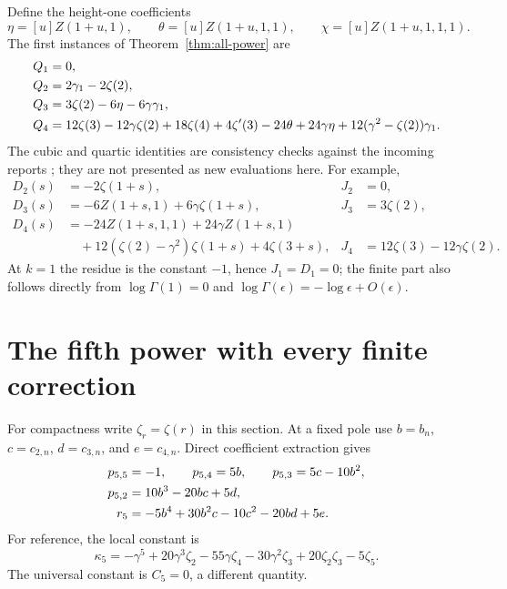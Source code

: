 \documentclass[11pt,a4paper]{article}
\numberwithin{equation}{section}
\theoremstyle{definition}
\theoremstyle{remark}
\begin{document}
Define the height-one coefficients
\begin{equation}
 \eta=[u]Z(1+u,1),\qquad
 \theta=[u]Z(1+u,1,1),\qquad
 \chi=[u]Z(1+u,1,1,1).
 \label{eq:height-coefficients}
\end{equation}
The first instances of Theorem~\ref{thm:all-power} are
\begin{align}
 Q_1={}&0,\notag\\
 Q_2={}&2\gamma_1-2\zeta(2),\label{eq:Q2}\\
 Q_3={}&3\zeta(2)-6\eta-6\gamma\gamma_1,\label{eq:Q3}\\
 Q_4={}&12\zeta(3)-12\gamma\zeta(2)+18\zeta(4)+4\zeta'(3)
       -24\theta+24\gamma\eta
                  +12(\gamma^2-\zeta(2))\gamma_1.
 \label{eq:Q4}
\end{align}
The cubic and quartic identities are consistency checks against the
incoming reports \cite{Quartic,Barnes}; they are not presented as new
evaluations here.  For example,
\begin{align*}
 D_2(s)&=-2\zeta(1+s),& J_2&=0,\\
 D_3(s)&=-6Z(1+s,1)+6\gamma\zeta(1+s),&J_3&=3\zeta(2),\\
 D_4(s)&=-24Z(1+s,1,1)+24\gamma Z(1+s,1)\\
       &\quad+12(\zeta(2)-\gamma^2)\zeta(1+s)+4\zeta(3+s),
       &J_4&=12\zeta(3)-12\gamma\zeta(2).
\end{align*}
At $k=1$ the residue is the constant $-1$, hence $J_1=D_1=0$;
the finite part also follows directly from $\log\Gamma(1)=0$ and
$\log\Gamma(\epsilon)=-\log\epsilon+O(\epsilon)$.

\section{The fifth power with every finite correction}
\label{sec:fifth}

For compactness write $\zeta_r=\zeta(r)$ in this section.  At a fixed
pole use $b=b_n$, $c=c_{2,n}$, $d=c_{3,n}$, and $e=c_{4,n}$.
Direct coefficient extraction gives
\begin{align}
 p_{5,5}&=-1,\qquad
 p_{5,4}=5b,\qquad
 p_{5,3}=5c-10b^2,\notag\\
 p_{5,2}&=10b^3-20bc+5d,\notag\\
 r_5&=-5b^4+30b^2c-10c^2-20bd+5e.
 \label{eq:p5}
\end{align}
For reference, the local constant is
\begin{equation}
 \kappa_5=-\gamma^5+20\gamma^3\zeta_2-55\gamma\zeta_4
             -30\gamma^2\zeta_3+20\zeta_2\zeta_3-5\zeta_5.
 \label{eq:kappa5}
\end{equation}
The universal constant is $C_5=0$, a different quantity.
\end{document}
